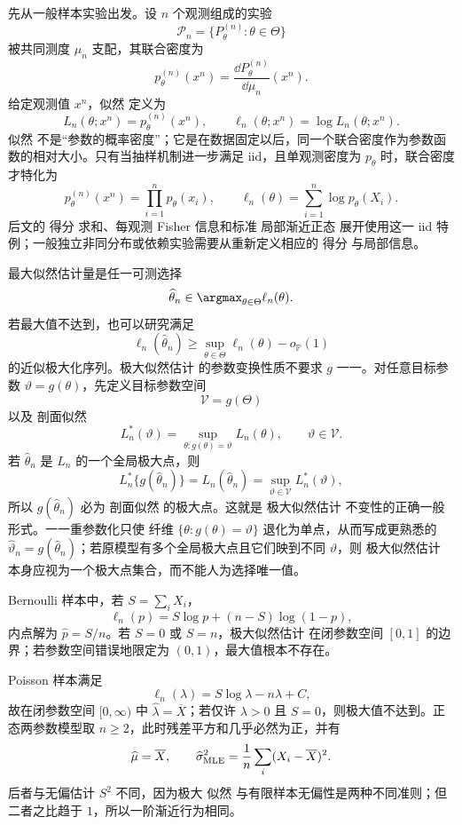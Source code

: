 \begin{definition}[样本似然]
先从一般样本实验出发。设 $n$ 个观测组成的实验
\[
 \mathcal P_n=\{P_\theta^{(n)}:\theta\in\Theta\}
\]
被共同测度 $\mu_n$ 支配，其联合密度为
\[
 p_\theta^{(n)}(x^n)
 =\frac{\dd P_\theta^{(n)}}{\dd\mu_n}(x^n).
\]
给定观测值 $x^n$，似然 定义为
\begin{equation}\label{eq:math-stat-general-likelihood}
 L_n(\theta;x^n)=p_\theta^{(n)}(x^n),
 \qquad
 \ell_n(\theta;x^n)=\log L_n(\theta;x^n).
\end{equation}
似然 不是“参数的概率密度”；它是在数据固定以后，同一个联合密度作为参数函数的相对大小。只有当抽样机制进一步满足 iid，且单观测密度为 $p_\theta$ 时，联合密度才特化为
\[
 p_\theta^{(n)}(x^n)=\prod_{i=1}^np_\theta(x_i),
 \qquad
 \ell_n(\theta)=\sum_{i=1}^n\log p_\theta(X_i).
\]
后文的 得分 求和、每观测 Fisher 信息和标准 局部渐近正态 展开使用这一 iid 特例；一般独立非同分布或依赖实验需要从重新定义相应的 得分 与局部信息。
\end{definition}

\begin{definition}[极大似然与剖面不变性]
最大似然估计量是任一可测选择
\[
 \widehat\theta_n
 \in\argmax_{\theta\in\Theta}\ell_n(\theta).
\]
若最大值不达到，也可以研究满足
\[
 \ell_n(\widehat\theta_n)
 \ge\sup_{\theta\in\Theta}\ell_n(\theta)-o_{\mathbb P}(1)
\]
的近似极大化序列。极大似然估计 的参数变换性质不要求 $g$ 一一。对任意目标参数 $\vartheta=g(\theta)$，先定义目标参数空间
\[
 \mathcal V=g(\Theta)
\]
以及 剖面似然
\begin{equation*}L_n^*(\vartheta)
 =\sup_{\theta:g(\theta)=\vartheta}L_n(\theta),
 \qquad \vartheta\in\mathcal V.
\end{equation*}
若 $\widehat\theta_n$ 是 $L_n$ 的一个全局极大点，则
\[
 L_n^*\{g(\widehat\theta_n)\}
 =L_n(\widehat\theta_n)
 =\sup_{\vartheta\in\mathcal V}L_n^*(\vartheta),
\]
所以 $g(\widehat\theta_n)$ 必为 剖面似然 的极大点。这就是 极大似然估计 不变性的正确一般形式。一一重参数化只使 纤维 $\{\theta:g(\theta)=\vartheta\}$ 退化为单点，从而写成更熟悉的 $\widehat\vartheta_n=g(\widehat\theta_n)$；若原模型有多个全局极大点且它们映到不同 $\vartheta$，则 极大似然估计 本身应视为一个极大点集合，而不能人为选择唯一值。
\end{definition}

\begin{exbox}
Bernoulli 样本中，若 $S=\sum_iX_i$，
\[
 \ell_n(p)=S\log p+(n-S)\log(1-p),
\]
内点解为 $\widehat p=S/n$。若 $S=0$ 或 $S=n$，极大似然估计 在闭参数空间 $[0,1]$ 的边界；若参数空间错误地限定为 $(0,1)$，最大值根本不存在。

Poisson 样本满足
\[
 \ell_n(\lambda)=S\log\lambda-n\lambda+C,
\]
故在闭参数空间 $[0,\infty)$ 中 $\widehat\lambda=\overline X$；若仅许 $\lambda>0$ 且 $S=0$，则极大值不达到。正态两参数模型取 $n\ge2$，此时残差平方和几乎必然为正，并有
\[
 \widehat\mu=\overline X,
 \qquad
 \widehat\sigma^2_{\rm MLE}
 =\frac1n\sum_i(X_i-\overline X)^2.
\]
后者与无偏估计 $S^2$ 不同，因为极大 似然 与有限样本无偏性是两种不同准则；但二者之比趋于 $1$，所以一阶渐近行为相同。
\end{exbox}

